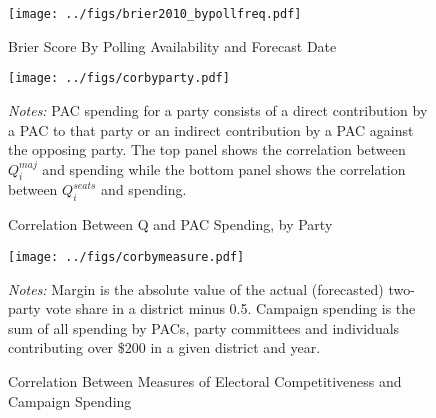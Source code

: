 \documentclass[12pt,final,fleqn]{article}
\theoremstyle{plain}
\begin{document}
\begin{figure}[!htb]
\begin{center}
\texttt{[image: ../figs/brier2010\_bypollfreq.pdf]}
\vspace{.5cm}
\caption{Brier Score By Polling Availability and Forecast Date}
\label{fig:Brier Score By Polling Availability and Forecast Date}
\begin{minipage}{\linewidth}
\footnotesize
\end{minipage}
\end{center}
\end{figure}

\begin{figure}[!htb]
\texttt{[image: ../figs/corbyparty.pdf]}
\vspace{.5cm}
\caption{Correlation Between Q and PAC Spending, by Party}
\label{fig:cor-q-party}
\begin{minipage}{\linewidth}
\footnotesize
\emph{Notes:} PAC spending for a party consists of a direct contribution by a PAC to that party or an indirect contribution by a PAC against the opposing party. The top panel shows the correlation between $Q_i^{maj}$ and spending while the bottom panel shows the correlation between $Q_i^{seats}$ and spending.
\end{minipage}
\end{figure}

\begin{figure}[!htb]
\texttt{[image: ../figs/corbymeasure.pdf]}
\vspace{.5cm}
\caption{Correlation Between Measures of Electoral Competitiveness and Campaign Spending}
\label{fig:Correlation Between Measures of Electoral Competitiveness and Campaign Spending}
\begin{minipage}{\linewidth}
\footnotesize
\emph{Notes:} Margin is the absolute value of the actual (forecasted) two-party vote share in a district minus 0.5. Campaign spending is the sum of all spending by PACs, party committees and individuals contributing over \$200 in a given district and year.
\end{minipage}
\end{figure}



\end{document}
